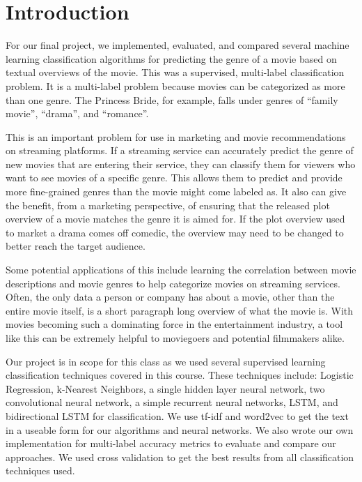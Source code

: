 \documentclass[sigconf]{acmart}
\begin{document}
%
\maketitle

\section{Introduction}
For our final project, we implemented, evaluated, and compared several machine learning classification algorithms for predicting the genre of a movie based on textual overviews of the movie.  This was a supervised, multi-label classification problem.  It is a multi-label problem because movies can be categorized as more than one genre. The Princess Bride, for example, falls under genres of ``family movie'', ``drama'', and ``romance''.  

This is an important problem for use in marketing and movie recommendations on streaming platforms. If a streaming service can accurately predict the genre of new movies that are entering their service, they can classify them for viewers who want to see movies of a specific genre. This allows them to predict and provide more fine-grained genres than the movie might come labeled as. It also can give the benefit, from a marketing perspective, of ensuring that the released plot overview of a movie matches the genre it is aimed for. If the plot overview used to market a drama comes off comedic, the overview may need to be changed to better reach the target audience. 

Some potential applications of this include learning the correlation between movie descriptions and movie genres to help categorize movies on streaming services.  Often, the only data a person or company has about a movie, other than the entire movie itself, is a short paragraph long overview of what the movie is.  With movies becoming such a dominating force in the entertainment industry, a tool like this can be extremely helpful to moviegoers and potential filmmakers alike.

Our project is in scope for this class as we used several supervised learning classification techniques covered in this course. These techniques include: Logistic Regression, k-Nearest Neighbors, a single hidden layer neural network, two convolutional neural network, a simple recurrent neural networks, LSTM, and bidirectional LSTM for classification. We use tf-idf and word2vec to get the text in a useable form for our algorithms and neural networks. We also wrote our own implementation for multi-label accuracy metrics to evaluate and compare our approaches.  We used cross validation to get the best results from all classification techniques used. 
\end{document}
